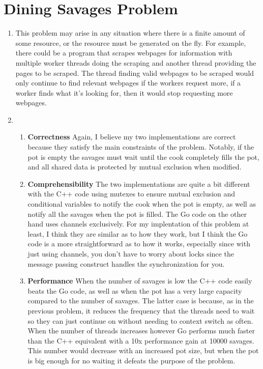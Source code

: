 \documentclass[11pt]{article}
\begin{document}
\section{Dining Savages Problem}
\begin{enumerate}
	\item This problem may arise in any situation where there is a finite amount of some resource, or the resource must be generated on the fly. For example, there could be a program that scrapes webpages for information with multiple worker threads doing the scraping and another thread providing the pages to be scraped. The thread finding valid webpages to be scraped would only continue to find relevant webpages if the workers request more, if a worker finds what it's looking for, then it would stop requesting more webpages.
	
	\item
	\begin{enumerate}
	\item \textbf{Correctness}\linebreak
	Again, I believe my two implementations are correct because they satisfy the main constraints of the problem. Notably, if the pot is empty the savages must wait until the cook completely fills the pot, and all shared data is protected by mutual exclusion when modified.
	\item \textbf{Comprehensibility}\linebreak
	The two implementations are quite a bit different with the C++ code using mutexes to ensure mutual exclusion and conditional variables to notify the cook when the pot is empty, as well as notify all the savages when the pot is filled. The Go code on the other hand uses channels exclusively. For my implentation of this problem at least, I think they are similar as to how they work, but I think the Go code is a more straightforward as to how it works, especially since with just using channels, you don't have to worry about locks since the message passing construct handles the synchronization for you. 
	\item \textbf{Performance}\linebreak
	When the number of savages is low the C++ code easily beats the Go code, as well as when the pot has a very large capacity compared to the number of savages. The latter case is because, as in the previous problem, it reduces the frequency that the threads need to wait so they can just continue on without needing to context switch as often. When the number of threads increases however Go performs much faster than the C++ equivalent with a 10x performance gain at 10000 savages. This number would decrease with an increased pot size, but when the pot is big enough for no waiting it defeats the purpose of the problem.
	\end{enumerate}
\end{enumerate}
\end{document}
